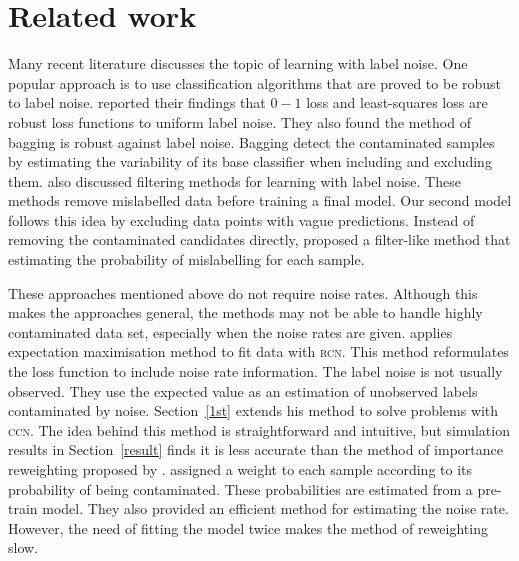 \documentclass{article} %
\begin{document}
\section{Related work}
Many recent literature discusses the topic of learning with label noise. One popular approach is to use classification algorithms that are proved to be robust to label noise. \citet{frenay2014classification} reported their findings that $0-1$ loss and least-squares loss are robust loss functions to uniform label noise. %
They also found the method of bagging is robust against label noise. Bagging detect the contaminated samples by estimating the variability of its base classifier when including and excluding them. %
\citet{frenay2014classification} also discussed filtering methods for learning with label noise. These methods remove mislabelled data before training a final model. Our second model follows this idea by excluding data points with vague predictions. Instead of removing the contaminated candidates directly, \citet{yang2018adasampling} proposed a filter-like method that estimating the probability of mislabelling for each sample. 

These approaches mentioned above do not require noise rates. Although this makes the approaches general, the methods may not be able to handle highly contaminated data set, especially when the noise rates are given. \citet{pmlr-v20-biggio11} applies expectation maximisation method to fit data with \textsc{rcn}. This method reformulates the loss function to include noise rate information. The label noise is not usually observed. They use the expected value as an estimation of unobserved labels contaminated by noise. Section~\ref{1st} extends his method to solve problems with \textsc{ccn}. The idea behind this method is straightforward and intuitive, but  simulation results in Section~\ref{result} finds it is less accurate than the method of importance reweighting proposed by \citet{liu2016classification}. \citet{liu2016classification} assigned a weight to each sample according to its probability of being contaminated. These probabilities are estimated from a pre-train model. They also provided an efficient method for estimating the noise rate. However, the need of fitting the model twice makes the method of reweighting slow.
\end{document}
